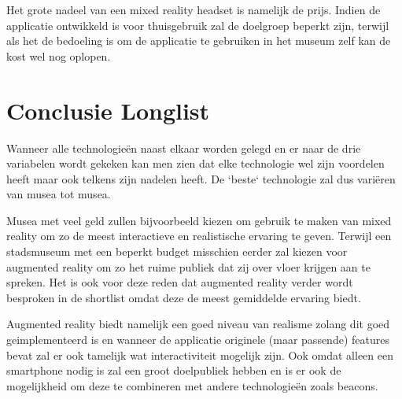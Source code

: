 Het grote nadeel van een mixed reality headset is namelijk de prijs. Indien de applicatie ontwikkeld is voor thuisgebruik zal de doelgroep beperkt zijn, terwijl als het de bedoeling is om de applicatie te gebruiken in het museum zelf kan de kost wel nog oplopen.


\section{Conclusie Longlist}
Wanneer alle technologieën naast elkaar worden gelegd en er naar de drie variabelen wordt gekeken kan men zien dat elke technologie wel zijn voordelen heeft maar ook telkens zijn nadelen heeft. De `beste` technologie zal dus variëren van musea tot musea. 

Musea met veel geld zullen bijvoorbeeld kiezen om gebruik te maken van mixed reality om zo de meest interactieve en realistische ervaring te geven. Terwijl een stadsmuseum met een beperkt budget misschien eerder zal kiezen voor augmented reality om zo het ruime publiek dat zij over vloer krijgen aan te spreken. Het is ook voor deze reden dat augmented reality verder wordt besproken in de shortlist omdat deze de meest gemiddelde ervaring biedt.

Augmented reality biedt namelijk een goed niveau van realisme zolang dit goed geimplementeerd is en wanneer de applicatie originele (maar passende) features bevat zal er ook tamelijk wat interactiviteit mogelijk zijn. Ook omdat alleen een smartphone nodig is zal een groot doelpubliek hebben en is er ook de mogelijkheid om deze te combineren met andere technologieën zoals beacons.